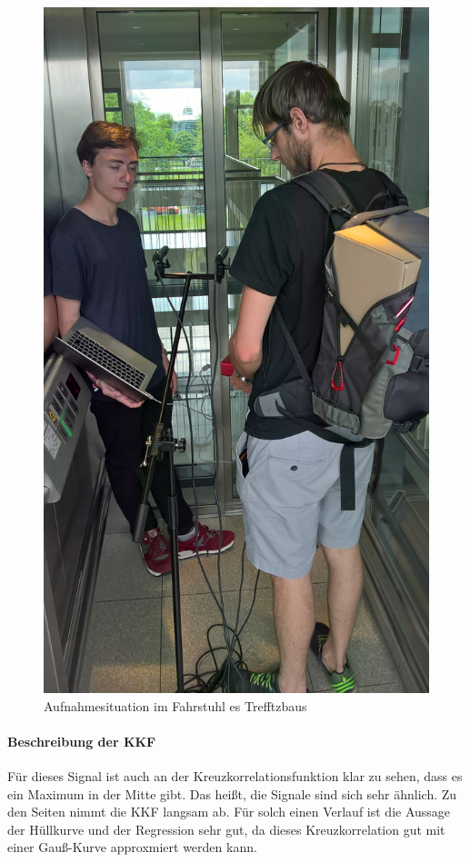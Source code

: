 \begin{figure}[ht!]
  \centering
  \includegraphics[width=\textwidth]{img/fahrstuhl}
  \caption{Aufnahmesituation im Fahrstuhl es Trefftzbaus}
  \label{figure4}
\end{figure}

\paragraph{Beschreibung der KKF}
Für dieses Signal ist auch an der Kreuzkorrelationsfunktion klar zu sehen, dass es ein Maximum in der Mitte gibt. Das heißt, die Signale sind sich sehr ähnlich. Zu den Seiten nimmt die KKF langsam ab. Für solch einen Verlauf ist die Aussage der Hüllkurve und der Regression sehr gut, da dieses Kreuzkorrelation gut mit einer Gauß-Kurve approxmiert werden kann.
